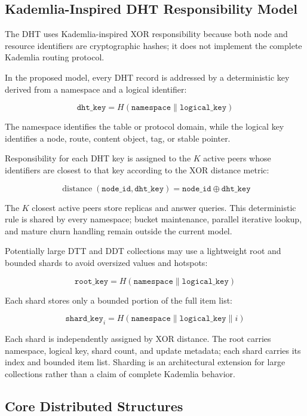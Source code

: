 \documentclass[
  12pt,
  oneside,
  a4paper,
  chapter=TITLE,
  section=TITLE,
  english,
  brazil
]{abntex2}
\begin{document}
\subsection{Kademlia-Inspired DHT Responsibility Model}

The DHT uses Kademlia-inspired XOR responsibility because both node and resource identifiers are cryptographic hashes; it does not implement the complete Kademlia routing protocol.

In the proposed model, every DHT record is addressed by a deterministic key derived
from a namespace and a logical identifier:

\[
\texttt{dht\_key} = H(\texttt{namespace} \parallel \texttt{logical\_key})
\]

The namespace identifies the table or protocol domain, while the logical key identifies a node, route, content object, tag, or stable pointer.

Responsibility for each DHT key is assigned to the \(K\) active peers whose
identifiers are closest to that key according to the XOR distance metric:

\[
\operatorname{distance}(\texttt{node\_id}, \texttt{dht\_key}) = \texttt{node\_id} \oplus \texttt{dht\_key}
\]

The $K$ closest active peers store replicas and answer queries. This deterministic rule is shared by every namespace; bucket maintenance, parallel iterative lookup, and mature churn handling remain outside the current model.

Potentially large DTT and DDT collections may use a lightweight root and bounded shards to avoid oversized values and hotspots:

\[
\texttt{root\_key} = H(\texttt{namespace} \parallel \texttt{logical\_key})
\]

Each shard stores only a bounded portion of the full item list:

\[
\texttt{shard\_key}_i = H(\texttt{namespace} \parallel \texttt{logical\_key} \parallel i)
\]

Each shard is independently assigned by XOR distance. The root carries namespace, logical key, shard count, and update metadata; each shard carries its index and bounded item list. Sharding is an architectural extension for large collections rather than a claim of complete Kademlia behavior.


\subsection{Core Distributed Structures}
\end{document}
